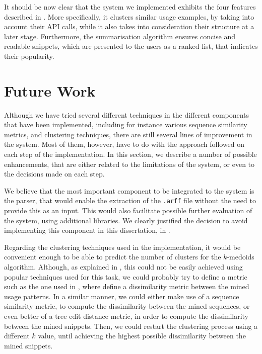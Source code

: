 It should be now clear that the system we implemented exhibits the four features described in . More specifically, it clusters similar usage examples, by taking into account their API calls, while it also takes into consideration their structure at a later stage. Furthermore, the summarisation algorithm ensures concise and readable snippets, which are presented to the users as a ranked list, that indicates their popularity.


\section{Future Work}
\label{sec:future-work}

Although we have tried several different techniques in the different components that have been implemented, including for instance various sequence similarity metrics, and clustering techniques, there are still several lines of improvement in the system. Most of them, however, have to do with the approach followed on each step of the implementation. In this section, we describe a number of possible enhancements, that are either related to the limitations of the system, or even to the decisions made on each step.

We believe that the most important component to be integrated to the system is the parser, that would enable the extraction of the \texttt{.arff} file without the need to provide this as an input. This would also facilitate possible further evaluation of the system, using additional libraries. We clearly justified the decision to avoid implementing this component in this dissertation, in .

Regarding the clustering techniques used in the implementation, it would be convenient enough to be able to predict the number of clusters for the $k$-medoids algorithm. Although, as explained in , this could not be easily achieved using popular techniques used for this task, we could probably try to define a metric such as the one used in \cite{Wang:2013}, where  define a dissimilarity metric between the mined usage patterns. In a similar manner, we could either make use of a sequence similarity metric, to compute the dissimilarity between the mined sequences, or even better of a tree edit distance metric, in order to compute the dissimilarity between the mined snippets. Then, we could restart the clustering process using a different $k$ value, until achieving the highest possible dissimilarity between the mined snippets.

